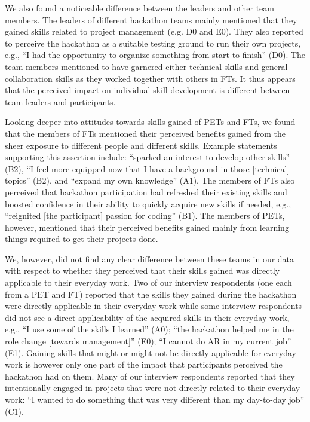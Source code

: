 \documentclass{hcij}
\begin{document}
We also found a noticeable difference between the leaders and other team members. The leaders of different hackathon teams mainly mentioned that they gained skills related to project management (e.g. D0 and E0). They also reported to perceive the hackathon as a suitable testing ground to run their own projects, e.g., “I had the opportunity to organize something from start to finish” (D0). The team members mentioned to have garnered either technical skills and general collaboration skills as they worked together with others in FTs. It thus appears that the perceived impact on individual skill development is different between team leaders and participants.

Looking deeper into attitudes towards skills gained of PETs and FTs, we found that the members of FTs mentioned their perceived benefits gained from the sheer exposure to different people and different skills. Example statements supporting this assertion include: “sparked an interest to develop other skills” (B2), “I feel more equipped now that I have a background in those [technical] topics” (B2), and “expand my own knowledge” (A1). The members of FTs also perceived that hackathon participation had refreshed their existing skills and boosted confidence in their ability to quickly acquire new skills if needed, e.g., “reignited [the participant] passion for coding” (B1). The members of PETs, however, mentioned that their perceived benefits gained mainly from learning things required to get their projects done.

We, however, did not find any clear difference between these teams in our data with respect to whether they perceived that their skills gained was directly applicable to their everyday work. Two of our interview respondents (one each from a PET and FT) reported that the skills they gained during the hackathon were directly applicable in their everyday work while some interview respondents did not see a direct applicability of the acquired skills in their everyday work, e.g., “I use some of the skills I learned” (A0); “the hackathon helped me in the role change [towards management]” (E0); “I cannot do AR in my current job” (E1). Gaining skills that might or might not be directly applicable for everyday work is however only one part of the impact that participants perceived the hackathon had on them. Many of our interview respondents reported that they intentionally engaged in projects that were not directly related to their everyday work: “I wanted to do something that was very different than my day-to-day job” (C1).
\end{document}
